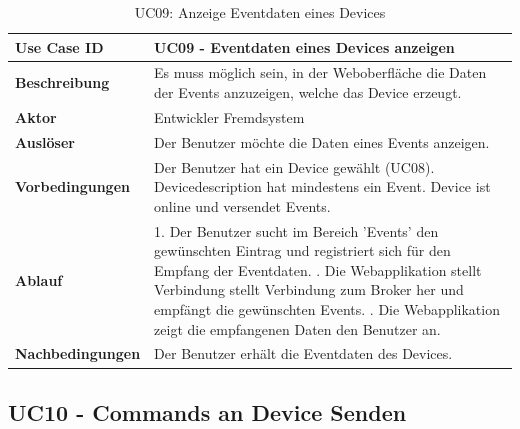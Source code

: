\begin{table}[H]
\begin{tabularx}{\textwidth}{|l|X|}

 \hline
 {\bf Use Case ID }    & UC09 - Eventdaten eines Devices anzeigen \\  \hline
 {\bf Beschreibung }   & Es muss möglich sein, in der Weboberfläche die Daten der Events anzuzeigen, welche das Device erzeugt. \\ \hline
 {\bf Aktor }          & Entwickler Fremdsystem \\ \hline
 {\bf Auslöser }       & Der Benutzer möchte die Daten eines Events anzeigen. \\ \hline
 {\bf Vorbedingungen } & 
     Der Benutzer hat ein Device gewählt (UC08). \newline
     Devicedescription hat mindestens ein Event. \newline 
     Device ist online und versendet Events. \\ \hline
 {\bf Ablauf }         & 
     1. Der Benutzer sucht im Bereich 'Events' den gewünschten Eintrag und registriert sich für den Empfang der Eventdaten. \newline
     2. Die Webapplikation stellt Verbindung stellt Verbindung zum Broker her und empfängt die gewünschten Events. \newline
     3. Die Webapplikation zeigt die empfangenen Daten den Benutzer an. \\ \hline
 {\bf Nachbedingungen} & Der Benutzer erhält die Eventdaten des Devices. \\ \hline
  
\end{tabularx}
\caption{UC09: Anzeige Eventdaten eines Devices}
\end{table}

\subsection{UC10 - Commands an Device Senden}

